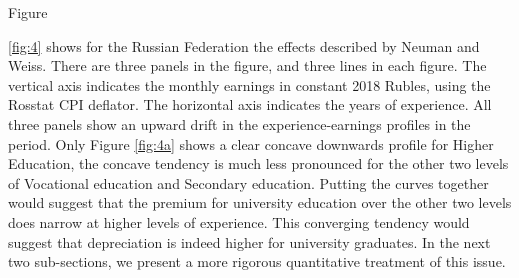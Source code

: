 \documentclass[12pt,a4paper]{article}
\numberwithin{equation}{section}
\begin{document}
Figure {\ref{fig:4} shows for the Russian Federation the effects described by Neuman and Weiss. There are three panels in the figure, and three lines in each figure. The vertical axis indicates the monthly earnings in constant 2018 Rubles, using the Rosstat CPI deflator. The horizontal axis indicates the years of experience. All three panels show an upward drift in the experience-earnings profiles in the period. Only Figure \ref{fig:4a} shows a clear concave downwards profile for Higher Education, the concave tendency is much less pronounced for the other two levels of Vocational education and Secondary education. Putting the curves together would suggest that the premium for university education over the other two levels does narrow at higher levels of experience. This converging tendency would suggest that depreciation is indeed higher for university graduates. In the next two sub-sections, we present a more rigorous quantitative treatment of this issue. 

}
\end{document}
